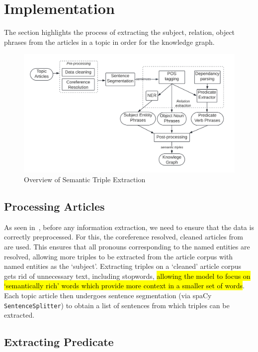 \section{Implementation}

The section highlights the process of extracting the subject, relation, object phrases from the articles in a topic in order for the knowledge graph. 

\begin{figure}[H]
  \centering
  \includegraphics[scale=0.15]{images/ste_imp.png}
  \vspace{-2ex}
  \caption{Overview of Semantic Triple Extraction}
  \label{fig:rel_overview}
\end{figure}

\subsection*{Processing Articles}
As seen in~, before any information extraction, we need to ensure that the data is correctly preprocessed. For this, the coreference resolved, cleaned articles from   are used. This ensures that all pronouns corresponding to the named entities are resolved, allowing more triples to be extracted from the article corpus with named entities as the `subject'. Extracting triples on a `cleaned' article corpus gets rid of unnecessary text, including stopwords, \hl{allowing the model to focus on `semantically rich' words which provide more context in a smaller set of words}. Each topic article then undergoes sentence segmentation (via spaCy \texttt{SentenceSplitter}) to obtain a list of sentences from which triples can be extracted.

\subsection*{Extracting Predicate}

